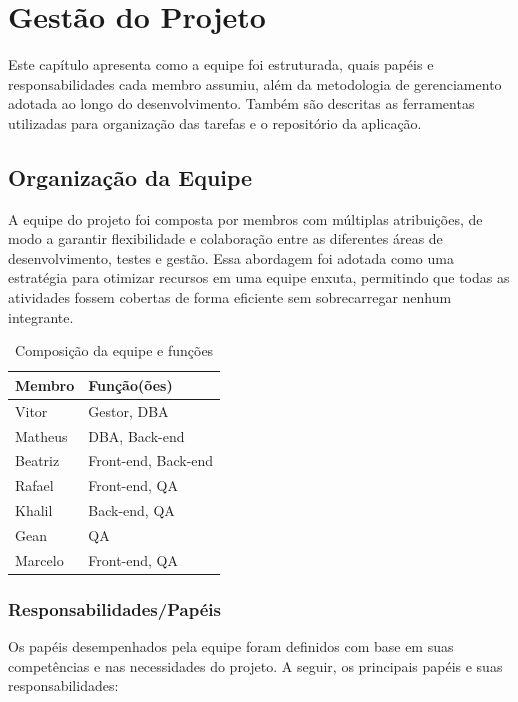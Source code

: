 \documentclass[
	12pt,				%
	openany,			%
	twoside,			%
	a4paper,			%
	english,			%
	brazil				%
	]{abntex2}
\begin{document}
\chapter{Gestão do Projeto}

Este capítulo apresenta como a equipe foi estruturada, quais papéis e responsabilidades cada membro assumiu, além da metodologia de gerenciamento adotada ao longo do desenvolvimento. Também são descritas as ferramentas utilizadas para organização das tarefas e o repositório da aplicação.

\section{Organização da Equipe}

A equipe do projeto foi composta por membros com múltiplas atribuições, de modo a garantir flexibilidade e colaboração entre as diferentes áreas de desenvolvimento, testes e gestão. Essa abordagem foi adotada como uma estratégia para otimizar recursos em uma equipe enxuta, permitindo que todas as atividades fossem cobertas de forma eficiente sem sobrecarregar nenhum integrante.

\begin{table}[htbp] 
\centering
\begin{tabular}{|l|l|}
\hline
\textbf{Membro} & \textbf{Função(ões)} \\ \hline
Vitor           & Gestor, DBA           \\ \hline
Matheus         & DBA, Back-end         \\ \hline
Beatriz         & Front-end, Back-end   \\ \hline
Rafael          & Front-end, QA         \\ \hline
Khalil              & Back-end, QA          \\ \hline
Gean            & QA                    \\ \hline
Marcelo         & Front-end, QA         \\ \hline
\end{tabular}
\caption{Composição da equipe e funções}
\end{table}


\subsection{Responsabilidades/Papéis}

Os papéis desempenhados pela equipe foram definidos com base em suas competências e nas necessidades do projeto. A seguir, os principais papéis e suas responsabilidades:
\end{document}

